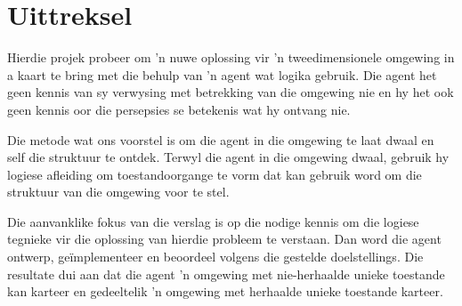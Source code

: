 {\let\clearpage\relax \chapter{Uittreksel}}


%
%



Hierdie projek probeer om 'n nuwe oplossing vir 'n  tweedimensionele omgewing in a kaart te bring met die behulp van 'n agent wat logika gebruik. Die agent het geen kennis van sy verwysing met betrekking van die omgewing nie en hy het ook geen kennis oor die persepsies se betekenis wat hy ontvang nie.

Die metode wat ons voorstel is om die agent in die omgewing te laat dwaal en self die struktuur te ontdek. Terwyl die agent in die omgewing dwaal, gebruik hy logiese afleiding om toestandoorgange te vorm dat kan gebruik word om die struktuur van die omgewing voor te stel.

Die aanvanklike fokus van die verslag is op die nodige kennis om die logiese tegnieke vir die oplossing van hierdie probleem te verstaan. Dan word die agent ontwerp, geïmplementeer en beoordeel volgens die gestelde doelstellings. Die resultate dui aan dat die agent 'n omgewing met nie-herhaalde unieke toestande kan karteer en gedeeltelik 'n omgewing met herhaalde unieke toestande karteer.